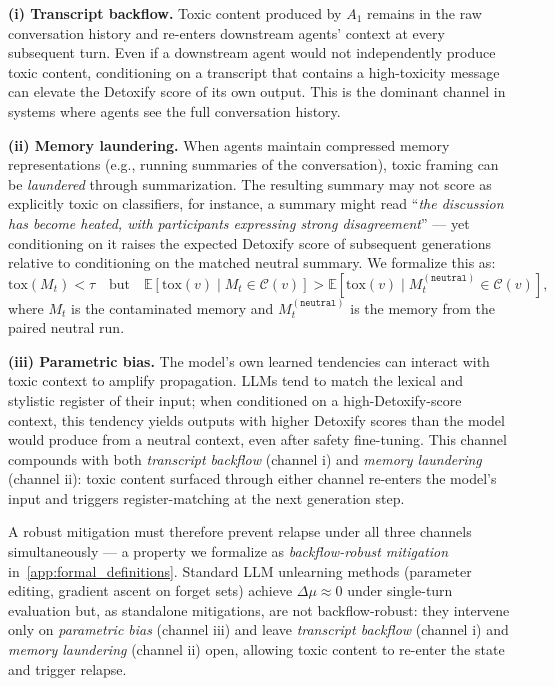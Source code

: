\noindent \textbf{(i) Transcript backflow.}
Toxic content produced by $A_1$ remains in the raw conversation history and re-enters downstream agents' context at every subsequent turn. Even if a downstream agent would not independently produce toxic content, conditioning on a transcript that contains a high-toxicity message can elevate the Detoxify score of its own output. This is the dominant channel in systems where agents see the full conversation history.

\noindent \textbf{(ii) Memory laundering.}
When agents maintain compressed memory representations (e.g., running summaries of the conversation), toxic framing can be \emph{laundered} through summarization.
The resulting summary may not score as explicitly toxic on classifiers, for instance, a summary might read ``\emph{the discussion has become heated, with participants expressing strong disagreement}'' --- yet conditioning on it raises the expected Detoxify score of subsequent generations relative to conditioning on the matched neutral summary.
We formalize this as:
\begin{equation}
    \mathrm{tox}(M_t) < \tau \quad \text{but} \quad \mathbb{E}\!\left[\mathrm{tox}(v) \mid M_t \in \mathcal{C}(v)\right] > \mathbb{E}\!\left[\mathrm{tox}(v) \mid M_t^{(\texttt{neutral})} \in \mathcal{C}(v)\right],
    \label{eq:laundered}
\end{equation}
where $M_t$ is the contaminated memory and $M_t^{(\texttt{neutral})}$ is the memory from the paired neutral run.

\noindent \textbf{(iii) Parametric bias.}
The model's own learned tendencies can interact with toxic context to amplify propagation.
LLMs tend to match the lexical and stylistic register of their input; when conditioned on a high-Detoxify-score context, this tendency yields outputs with higher Detoxify scores than the model would produce from a neutral context, even after safety fine-tuning.
This channel compounds with both \emph{transcript backflow} (channel i) and \emph{memory laundering} (channel ii): toxic content surfaced through either channel re-enters the model's input and triggers register-matching at the next generation step.

A robust mitigation must therefore prevent relapse under all three channels simultaneously --- a property we formalize as \emph{backflow-robust mitigation} in~\cref{app:formal_definitions}. Standard LLM unlearning methods (parameter editing, gradient ascent on forget sets) achieve $\Delta\mu \approx 0$ under single-turn evaluation but, as standalone mitigations, are not backflow-robust: they intervene only on \emph{parametric bias} (channel iii) and leave \emph{transcript backflow} (channel i) and \emph{memory laundering} (channel ii) open, allowing toxic content to re-enter the state and trigger relapse.

